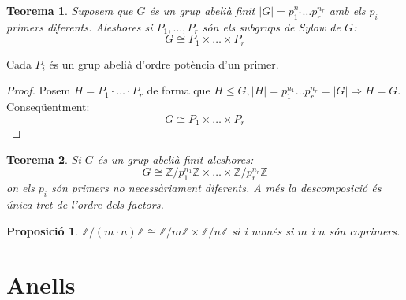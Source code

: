 \documentclass[a4paper,11pt]{report}
\newcommand{\ordre}[1]{|#1|}
\theoremstyle{theorem}
\newtheorem{proposicio}{\normalfont \sffamily\bfseries Proposició}[section]
\newtheorem{teorema}{\normalfont \sffamily\bfseries Teorema}[section]
\theoremstyle{definition}
\begin{document}
\begin{teorema}
	Suposem que $G$ és un grup abelià finit $\ordre{G}=p_1^{n_1}\ldots p_r^{n_r}$ amb els $p_i$ primers diferents. Aleshores si $P_1,\ldots,P_r$ són els subgrups de Sylow de $G$:
	$$G\cong P_1\times\ldots\times P_r$$
\end{teorema}
Cada $P_i$ és un grup abelià d'ordre potència d'un primer.
\begin{proof}
	Posem $H=P_1\cdot\ldots\cdot P_r$ de forma que $H\leq G,\ordre{H}=p_1^{n_1}\ldots p_r^{n_r}=\ordre{G}\Rightarrow H=G$. Conseqüentment:
		$$G\cong P_1\times\ldots\times P_r$$
\end{proof}
\begin{teorema}
Si $G$ és un grup abelià finit aleshores:$$G\cong \mathbb{Z}/p_1^{n_1}\mathbb{Z}\times\ldots\times \mathbb{Z}/p_r^{n_r}\mathbb{Z}$$
on els $p_i$ són primers no necessàriament diferents. A més la descomposició és única tret de l'ordre dels factors.
\end{teorema}
\begin{proposicio}
	$\mathbb{Z}/(m\cdot n)\mathbb{Z}\cong\mathbb{Z}/m\mathbb{Z}\times \mathbb{Z}/ n\mathbb{Z}$ si i només si $m$ i $n$ són coprimers.
\end{proposicio}
\newpage
\chapter{Anells}
\end{document}
